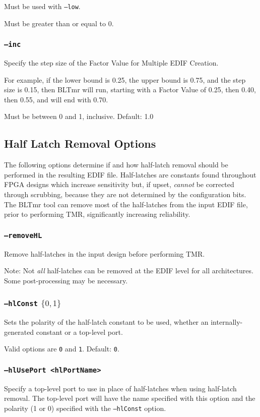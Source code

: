 \documentclass[english]{article}
\begin{document}
Must be used with \texttt{--low}.

Must be greater than or equal to 0.

\subsubsection{\texttt{--inc}}
Specify the step size of the Factor Value for Multiple EDIF Creation.

For example, if the lower bound is 0.25, the upper bound is 0.75, and the step
size is 0.15, then BLTmr will run, starting with a Factor Value of 0.25, then
0.40, then 0.55, and will end with 0.70.

Must be between 0 and 1, inclusive. Default: 1.0

\subsection{Half Latch Removal Options}
The following options determine if and how half-latch removal should be
performed in the resulting EDIF file. Half-latches are constants found
throughout FPGA designs which increase sensitivity but, if upset, \emph{cannot}
be corrected through scrubbing, because they are not determined by the
configuration bits. The BLTmr tool can remove most of the half-latches from the
input EDIF file, prior to performing TMR, significantly increasing reliability.

\subsubsection{\texttt{--removeHL}}
Remove half-latches in the input design before performing TMR.

Note: Not \emph{all} half-latches can be removed at the EDIF 
level for all architectures. Some post-processing may be necessary.

\subsubsection{\texttt{--hlConst} $\{0,1\}$}
Sets the polarity of the half-latch constant to be used, whether an 
internally-generated constant or a top-level port. 

Valid options are \texttt{0} and \texttt{1}. Default: \texttt{0}.

\subsubsection{\texttt{--hlUsePort <hlPortName>}}
Specify a top-level port to use in place of half-latches when 
using half-latch removal. The top-level port will have the name specified with 
this option and the polarity (1 or 0) specified with the \texttt{--hlConst} 
option.
\end{document}
